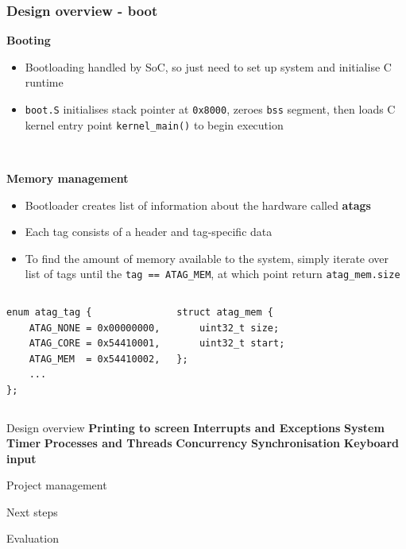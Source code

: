 \documentclass[10pt]{beamer}
\begin{document}
\begin{frame}[fragile]
    \frametitle{Design overview - boot}
    \textbf{Booting}
    \begin{itemize}
        \item Bootloading handled by SoC, so just need to set up system and initialise C runtime
        \item \texttt{boot.S} initialises stack pointer at \texttt{0x8000}, zeroes \texttt{bss} segment, then loads C kernel entry point \texttt{kernel\_main()} to begin execution
    \end{itemize} ~

    \textbf{Memory management}
    \begin{itemize}
        \item Bootloader creates list of information about the hardware called \textbf{atags}
        \item Each tag consists of a header and tag-specific data
        \item To find the amount of memory available to the system, simply iterate over list of tags until the \texttt{tag == ATAG\_MEM}, at which point return \texttt{atag\_mem.size}
    \end{itemize}

    \begin{columns}[t]
        \lstset{language=C,basicstyle=\ttfamily}
        \begin{lstlisting}
enum atag_tag {
    ATAG_NONE = 0x00000000,
    ATAG_CORE = 0x54410001,
    ATAG_MEM  = 0x54410002,
    ...
};
        \end{lstlisting}
        \begin{lstlisting}
struct atag_mem {
    uint32_t size;
    uint32_t start;
};
        \end{lstlisting}
    \end{columns}

\end{frame}

\begin{frame}{Design overview}
    \textbf{Printing to screen}
    \textbf{Interrupts and Exceptions}
    \textbf{System Timer}
    \textbf{Processes and Threads}
    \textbf{Concurrency}
    \textbf{Synchronisation}
    \textbf{Keyboard input}
\end{frame}


\begin{frame}{Project management}

\end{frame}

\begin{frame}{Next steps}

\end{frame}

\begin{frame}{Evaluation}

\end{frame}
\end{document}
